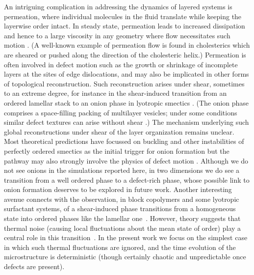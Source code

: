 \documentclass[8.5pt,twoside,twocolumn]{article}
\begin{document}
An intriguing complication in addressing the dynamics of layered systems
is permeation,
where individual molecules in the fluid translate while keeping the
layerwise order intact. In steady state, permeation leads to increased dissipation
and hence to a large viscosity in any geometry where flow necessitates such motion \cite{deGennes}. (A well-known example of permeation flow
is found in cholesterics which are sheared or pushed along the direction
of the cholesteric helix.) Permeation is often involved in defect motion such as the growth or shrinkage of incomplete layers at the sites of edge dislocations, and may also be implicated in other forms of topological reconstruction. Such reconstruction arises under shear, sometimes to an extreme degree, for instance in the shear-induced transition from an ordered lamellar stack to an onion phase in lyotropic smectics \cite{Diat93,Panizza96,Iwashita07,Gradzielski03}. (The onion phase comprises a space-filling packing of multilayer vesicles; under some conditions similar defect textures can arise without shear \cite{Gomati87,Boltenhagen92,Fournier94,Ramos04}.) The mechanism underlying such global reconstructions under shear of the layer organization remains unclear. Most theoretical predictions have focussed on buckling and other instabilities of perfectly ordered smectics as the initial trigger for onion formation \cite{Zilman99,Courbin02,Guo2002,Soddemann2004, Stewart2009} but the pathway may also strongly involve the physics of defect motion \cite{Zipfel99, Leon00}. Although we do not see onions in the simulations reported here, in two dimensions we do see a transition from a well ordered phase to a defect-rich phase, whose possible link to onion formation deserves to be explored in future work. Another interesting avenue connects with the observation, in block copolymers and some lyotropic surfactant systems, of a shear-induced
phase transitions from a homogeneous state into ordered phases
like the lamellar one~\cite{Cates89,Koppi93,Fredrickson94}. However, theory suggests that thermal noise (causing local fluctuations about the mean state of order) play a central role in this transition~\cite{Cates89}. In the present work we focus on the simplest case in which such thermal fluctuations are ignored, and the time evolution of the microstructure is deterministic (though certainly chaotic and unpredictable
once defects are present).
\end{document}
